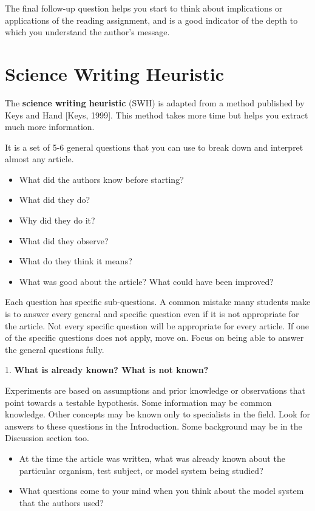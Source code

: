 \documentclass[
]{book}
\providecommand{\tightlist}{%
  \setlength{\itemsep}{0pt}\setlength{\parskip}{0pt}}
\begin{document}
The final follow-up question helps you start to think about implications or applications of the reading assignment, and is a good indicator of the depth to which you understand the author's message.

\hypertarget{science-writing-heuristic}{%
\section{Science Writing Heuristic}\label{science-writing-heuristic}}

The \textbf{science writing heuristic} (SWH) is adapted from a method published by Keys and Hand {[}Keys, 1999{]}. This method takes more time but helps you extract much more information.

It is a set of 5-6 general questions that you can use to break down and interpret almost any article.

\begin{itemize}
\tightlist
\item
  What did the authors know before starting?
\item
  What did they do?
\item
  Why did they do it?
\item
  What did they observe?
\item
  What do they think it means?
\item
  What was good about the article? What could have been improved?
\end{itemize}

Each question has specific sub-questions. A common mistake many students make is to answer every general and specific question even if it is not appropriate for the article. Not every specific question will be appropriate for every article. If one of the specific questions does not apply, move on. Focus on being able to answer the general questions fully.

1. \textbf{What is already known? What is not known?}

Experiments are based on assumptions and prior knowledge or observations that point towards a testable hypothesis. Some information may be common knowledge. Other concepts may be known only to specialists in the field. Look for answers to these questions in the Introduction. Some background may be in the Discussion section too.

\begin{itemize}
\tightlist
\item
  At the time the article was written, what was already known about the particular organism, test subject, or model system being studied?
\item
  What questions come to your mind when you think about the model system that the authors used?
\end{itemize}
\end{document}
